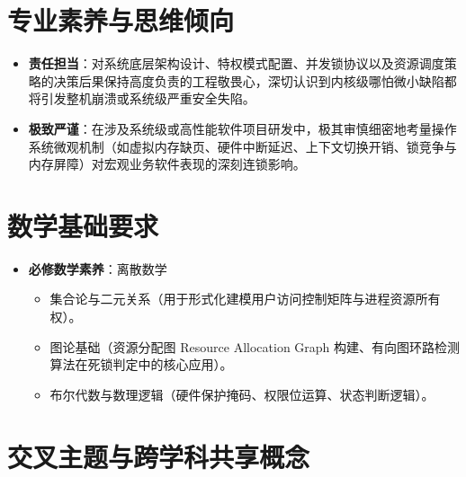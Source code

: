 \section{专业素养与思维倾向}

\begin{itemize}\setlength{\itemsep}{0pt}\setlength{\parskip}{0pt}
    \item \textbf{责任担当}：对系统底层架构设计、特权模式配置、并发锁协议以及资源调度策略的决策后果保持高度负责的工程敬畏心，深切认识到内核级哪怕微小缺陷都将引发整机崩溃或系统级严重安全失陷。
    \item \textbf{极致严谨}：在涉及系统级或高性能软件项目研发中，极其审慎细密地考量操作系统微观机制（如虚拟内存缺页、硬件中断延迟、上下文切换开销、锁竞争与内存屏障）对宏观业务软件表现的深刻连锁影响。
\end{itemize}

\section{数学基础要求}

\begin{itemize}\setlength{\itemsep}{0pt}\setlength{\parskip}{0pt}
    \item \textbf{必修数学素养}：离散数学
    \begin{itemize}\setlength{\itemsep}{0pt}\setlength{\parskip}{0pt}
        \item 集合论与二元关系（用于形式化建模用户访问控制矩阵与进程资源所有权）。
        \item 图论基础（资源分配图 Resource Allocation Graph 构建、有向图环路检测算法在死锁判定中的核心应用）。
        \item 布尔代数与数理逻辑（硬件保护掩码、权限位运算、状态判断逻辑）。
    \end{itemize}
\end{itemize}

\section{交叉主题与跨学科共享概念}

